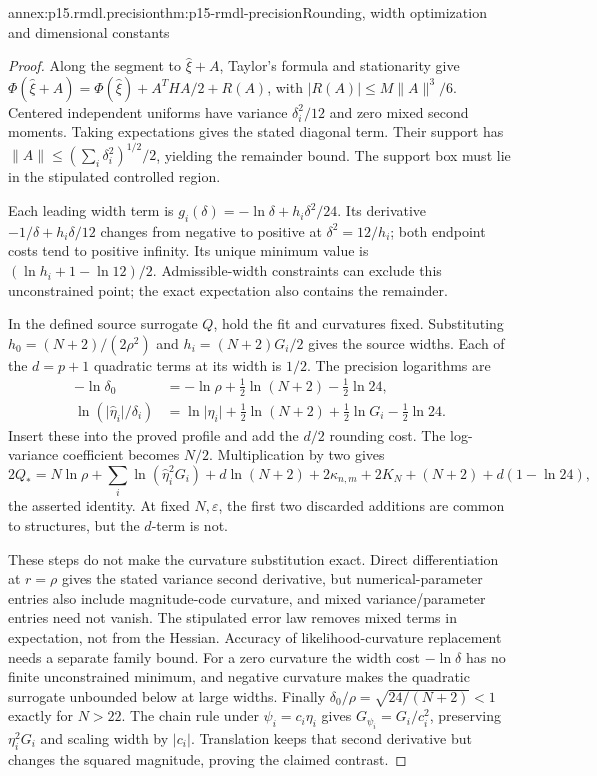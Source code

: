 \begin{annexitem}{annex:p15.rmdl.precision}{thm:p15-rmdl-precision}{Rounding, width optimization and dimensional constants}
\begin{proof}
Along the segment to \(\widehat\xi+A\), Taylor's formula and
stationarity give \(\Phi(\widehat\xi+A)=\Phi(\widehat\xi)+A^THA/2+R(A)\),
with \(\lvert R(A)\rvert\leq M\|A\|^3/6\).
Centered independent uniforms have variance \(\delta_i^2/12\) and
zero mixed second moments. Taking expectations gives the stated diagonal
term. Their support has
\(\|A\|\leq(\sum_i\delta_i^2)^{1/2}/2\), yielding the remainder
bound. The support box must lie in the stipulated controlled region.

Each leading width term is
\(g_i(\delta)=-\ln\delta+h_i\delta^2/24\).
Its derivative \(-1/\delta+h_i\delta/12\) changes from negative
to positive at \(\delta^2=12/h_i\); both endpoint costs tend to
positive infinity. Its unique minimum value is
\((\ln h_i+1-\ln12)/2\). Admissible-width constraints can exclude
this unconstrained point; the exact expectation also contains the remainder.

In the defined source surrogate \(Q\), hold the fit and curvatures fixed.
Substituting \(h_0=(N+2)/(2\rho^2)\) and
\(h_i=(N+2)G_i/2\) gives the source widths. Each of the \(d=p+1\)
quadratic terms at its width is \(1/2\). The precision logarithms are
\[
\begin{aligned}
 -\ln\delta_0&=-\ln\rho+\tfrac12\ln(N+2)-\tfrac12\ln24,\\
 \ln(\lvert\widehat\eta_i\rvert/\delta_i)
 &=\ln\lvert\widehat\eta_i\rvert+\tfrac12\ln(N+2)
                         +\tfrac12\ln G_i-\tfrac12\ln24.
\end{aligned}
\]
Insert these into the proved profile and add the \(d/2\) rounding cost.
The log-variance coefficient becomes \(N/2\). Multiplication by two gives
\[
 2Q_*=N\ln\rho+\sum_i\ln(\widehat\eta_i^2G_i)+d\ln(N+2)
       +2\kappa_{n,m}+2K_N+(N+2)+d(1-\ln24),
\]
the asserted identity. At fixed \(N,\varepsilon\), the first two
discarded additions are common to structures, but the \(d\)-term is not.

These steps do not make the curvature substitution exact. Direct
differentiation at \(r=\rho\) gives the stated variance second derivative,
but numerical-parameter entries also include magnitude-code curvature,
and mixed variance/parameter entries need not vanish. The stipulated
error law removes mixed terms in expectation, not from the Hessian.
Accuracy of likelihood-curvature replacement needs a separate family bound.
For a zero curvature the width cost \(-\ln\delta\) has no finite
unconstrained minimum, and negative curvature makes the quadratic
surrogate unbounded below at large widths. Finally
\(\delta_0/\rho=\sqrt{24/(N+2)}<1\) exactly for \(N>22\).
The chain rule under \(\psi_i=c_i\eta_i\) gives
\(G_{\psi_i}=G_i/c_i^2\), preserving \(\eta_i^2G_i\) and scaling
width by \(\lvert c_i\rvert\). Translation keeps that second
derivative but changes the squared magnitude, proving the claimed contrast.
\end{proof}
\end{annexitem}

